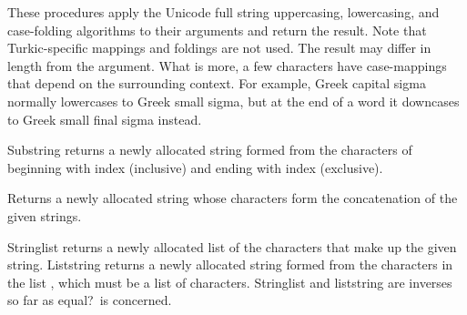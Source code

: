 \begin{entry}{%
}


These procedures apply the Unicode full string uppercasing, lowercasing,
and case-folding algorithms to their arguments and return the result.
Note that Turkic-specific mappings and foldings are not used.  
The result may differ in length from the argument.  What is more, a
few characters have case-mappings that depend on the surrounding context.
For example, Greek capital sigma normally lowercases to Greek small sigma,
but at the end of a word it downcases to Greek small final sigma instead.

\end{entry}


\begin{entry}{%
}

{\cf Substring} returns a newly allocated string formed from the characters of
 beginning with index  (inclusive) and ending with index
 (exclusive).
\end{entry}


\begin{entry}{%
}

Returns a newly allocated string whose characters form the concatenation of the
given strings.

\end{entry}


\begin{entry}{%
}

{\cf String\coerce{}list} returns a newly allocated list of the
characters that make up the given string.  {\cf List\coerce{}string}
returns a newly allocated string formed from the characters in the list
, which must be a list of characters. {\cf String\coerce{}list}
and {\cf list\coerce{}string} are
inverses so far as {\cf equal?}\ is concerned.  

\end{entry}


